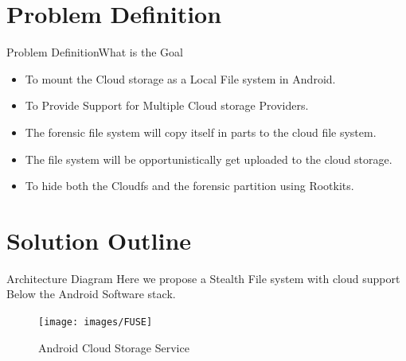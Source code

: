 \documentclass{beamer}
\begin{document}
\section{Problem Definition}
\begin{frame}{Problem Definition}{What is the Goal}
\begin{itemize}
\item To mount the Cloud storage as a Local File system in Android.
\item To Provide Support for Multiple Cloud storage Providers.
\item The forensic file system will copy itself in parts to the cloud file system.
\item The file system will be opportunistically get uploaded to the cloud storage.

\item To hide both the Cloudfs and the forensic partition using Rootkits.
\end{itemize}
\end{frame}
\section{Solution Outline}
\begin{frame}{Architecture Diagram}
Here we propose a Stealth File system with cloud support Below the Android Software
stack.
\begin{figure}
\centering

\texttt{[image: images/FUSE]}
\caption{Android Cloud Storage Service}
\label{imageLabel}
\end{figure}
\end{frame}
\end{document}
